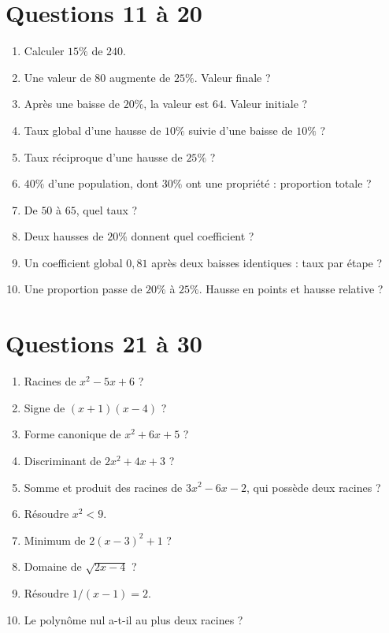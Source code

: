 \documentclass[11pt,a4paper,oneside]{book}
\begin{document}
\section{Questions 11 à 20}
\begin{enumerate}[start=11]
\item Calculer $15\%$ de $240$.
\item Une valeur de $80$ augmente de $25\%$. Valeur finale ?
\item Après une baisse de $20\%$, la valeur est $64$. Valeur initiale ?
\item Taux global d'une hausse de $10\%$ suivie d'une baisse de $10\%$ ?
\item Taux réciproque d'une hausse de $25\%$ ?
\item $40\%$ d'une population, dont $30\%$ ont une propriété : proportion totale ?
\item De $50$ à $65$, quel taux ?
\item Deux hausses de $20\%$ donnent quel coefficient ?
\item Un coefficient global $0{,}81$ après deux baisses identiques : taux par étape ?
\item Une proportion passe de $20\%$ à $25\%$. Hausse en points et hausse relative ?
\end{enumerate}
\section{Questions 21 à 30}
\begin{enumerate}[start=21]
\item Racines de $x^2-5x+6$ ?
\item Signe de $(x+1)(x-4)$ ?
\item Forme canonique de $x^2+6x+5$ ?
\item Discriminant de $2x^2+4x+3$ ?
\item Somme et produit des racines de $3x^2-6x-2$, qui possède deux racines ?
\item Résoudre $x^2<9$.
\item Minimum de $2(x-3)^2+1$ ?
\item Domaine de $\sqrt{2x-4}$ ?
\item Résoudre $1/(x-1)=2$.
\item Le polynôme nul a-t-il au plus deux racines ?
\end{enumerate}
\end{document}

